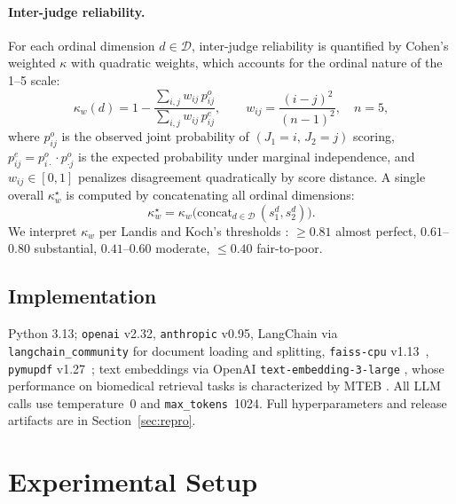 \documentclass[final, 11pt, 3p]{elsarticle}
\begin{document}
\paragraph{Inter-judge reliability.} For each ordinal dimension
$d \in \mathcal{D}$, inter-judge reliability is quantified by Cohen's
weighted $\kappa$ \cite{Cohen1968} with quadratic weights, which
accounts for the ordinal nature of the 1--5 scale:
\begin{equation}
\kappa_w(d) = 1 - \frac{\sum_{i,j} w_{ij}\, p_{ij}^{o}}{\sum_{i,j} w_{ij}\, p_{ij}^{e}},\qquad
w_{ij} = \frac{(i-j)^2}{(n-1)^2},\quad n = 5,
\label{eq:kappa}
\end{equation}
where $p_{ij}^{o}$ is the observed joint probability of $(J_1{=}i,\,J_2{=}j)$
scoring, $p_{ij}^{e} = p_{i\cdot}^{o} \cdot p_{\cdot j}^{o}$ is the
expected probability under marginal independence, and
$w_{ij} \in [0,1]$ penalizes disagreement quadratically by score
distance. A single overall $\kappa_w^{\star}$ is computed by
concatenating all ordinal dimensions:
\begin{equation}
\kappa_w^{\star} = \kappa_w\bigl(\mathrm{concat}_{d \in \mathcal{D}}\,(s_1^d, s_2^d)\bigr).
\end{equation}
We interpret $\kappa_w$ per Landis and Koch's
thresholds \cite{LandisKoch1977}: $\geq 0.81$ almost perfect,
$0.61$--$0.80$ substantial, $0.41$--$0.60$ moderate, $\leq 0.40$
fair-to-poor.

\subsection{Implementation}
Python 3.13; \texttt{openai} v2.32, \texttt{anthropic} v0.95,
LangChain \cite{LangChain2023} via \texttt{langchain\_community} for
document loading and splitting, \texttt{faiss-cpu}
v1.13~\cite{Douze2024FAISS}, \texttt{pymupdf}
v1.27~\cite{Artifex_PyMuPDF}; text embeddings via OpenAI
\texttt{text-embedding-3-large} \cite{OpenAIEmbeddings2024}, whose
performance on biomedical retrieval tasks is characterized by MTEB
\cite{MTEB2023}. All LLM calls use temperature~0 and
\texttt{max\_tokens}~1024. Full hyperparameters and release artifacts
are in Section~\ref{sec:repro}.

\section{Experimental Setup}
\label{sec:setup}
\end{document}
